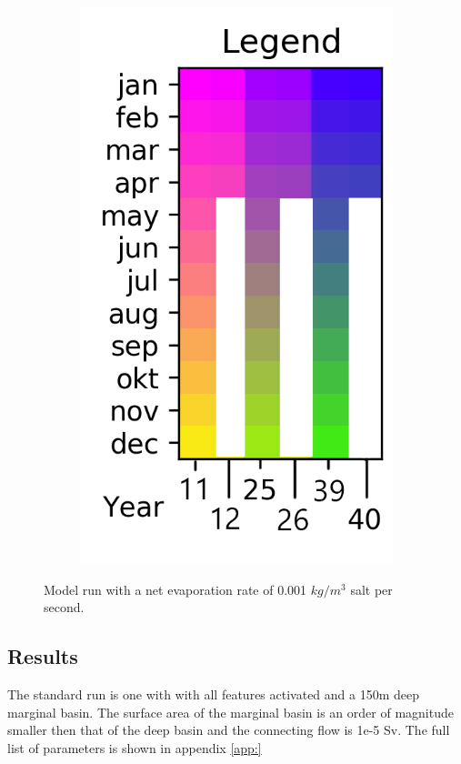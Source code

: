 \documentclass[twocolumn]{article}
\begin{document}
\begin{figure}
\begin{subfigure}[h]{0.20\textwidth}
\includegraphics[width=\linewidth,keepaspectratio]{40yr_reduced_Legend.png}
\end{subfigure}\hfill
\caption{Model run with a net evaporation rate of 0.001 $kg/m^3$ salt per second.}
\label{fig:net_evap}
\end{figure}



\subsection{Results}
The standard run is one with with all features activated and a 150m deep marginal basin. The surface area of the marginal basin is an order of magnitude smaller then that of the deep basin and the connecting flow is 1e-5 Sv. The full list of parameters is shown in appendix \ref{app:}
\end{document}
